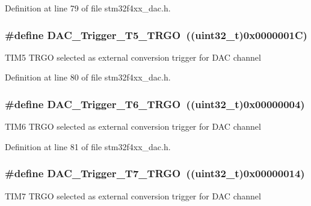 Definition at line 79 of file stm32f4xx\-\_\-dac.\-h.

\hypertarget{group___d_a_c__trigger__selection_ga35352cebfd1ae8a3d63e374a5d86a85d}{
\subsubsection[{D\-A\-C\-\_\-\-Trigger\-\_\-\-T5\-\_\-\-T\-R\-G\-O}]{\setlength{\rightskip}{0pt plus 5cm}\#define D\-A\-C\-\_\-\-Trigger\-\_\-\-T5\-\_\-\-T\-R\-G\-O~((uint32\-\_\-t)0x0000001\-C)}}\label{group___d_a_c__trigger__selection_ga35352cebfd1ae8a3d63e374a5d86a85d}
T\-I\-M5 T\-R\-G\-O selected as external conversion trigger for D\-A\-C channel 

Definition at line 80 of file stm32f4xx\-\_\-dac.\-h.

\hypertarget{group___d_a_c__trigger__selection_ga083307783678a2f1d3066db57dc84cfe}{
\subsubsection[{D\-A\-C\-\_\-\-Trigger\-\_\-\-T6\-\_\-\-T\-R\-G\-O}]{\setlength{\rightskip}{0pt plus 5cm}\#define D\-A\-C\-\_\-\-Trigger\-\_\-\-T6\-\_\-\-T\-R\-G\-O~((uint32\-\_\-t)0x00000004)}}\label{group___d_a_c__trigger__selection_ga083307783678a2f1d3066db57dc84cfe}
T\-I\-M6 T\-R\-G\-O selected as external conversion trigger for D\-A\-C channel 

Definition at line 81 of file stm32f4xx\-\_\-dac.\-h.

\hypertarget{group___d_a_c__trigger__selection_ga9b92d497746be54af46ae4e9c1fc4a6f}{
\subsubsection[{D\-A\-C\-\_\-\-Trigger\-\_\-\-T7\-\_\-\-T\-R\-G\-O}]{\setlength{\rightskip}{0pt plus 5cm}\#define D\-A\-C\-\_\-\-Trigger\-\_\-\-T7\-\_\-\-T\-R\-G\-O~((uint32\-\_\-t)0x00000014)}}\label{group___d_a_c__trigger__selection_ga9b92d497746be54af46ae4e9c1fc4a6f}
T\-I\-M7 T\-R\-G\-O selected as external conversion trigger for D\-A\-C channel 

